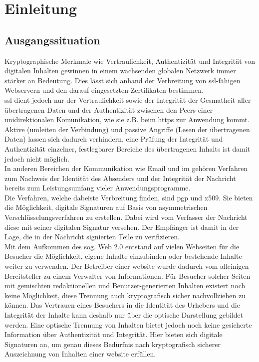 
\chapter{Einleitung}
%
\label{chp:Einleitung}

\section{Ausgangssituation}
%
\label{sec:Einleitung:ausgangssituation}
Kryptographische Merkmale wie Vertraulichkeit, Authentizität und Integrität von digitalen Inhalten gewinnen in einem wachsenden globalen Netzwerk immer
stärker an Bedeutung. Dies lässt sich anhand der Verbreitung von \gls{ssl}-fähigen Webservern und den darauf eingesetzten Zertifikaten bestimmen\cite{ssliverse:eff}.\\

\gls{ssl} dient jedoch nur der Vertraulichkeit sowie der Integrität der Gesmatheit aller übertragenen Daten und der Authentizität zwischen den Peers einer unidirektionalen
Komunikation, wie sie z.B. beim \gls{https} zur Anwendung kommt\cite{kits}. Aktive (umleiten der Verbindung) und passive Angriffe (Lesen der übertragenen Daten)
lassen sich dadurch verhindern, eine Prüfung der Integrität und Authentizität einzelner, festlegbarer Bereiche des übertragenen Inhalts ist damit jedoch nicht möglich.\\

In anderen Bereichen der Kommunikation wie Email und \gls{im} gehören Verfahren zum Nachweis der Identität des Absenders und der Integrität der Nachricht
bereits zum Leistungsumfang vieler Anwendungsprogramme\cite{2719799020071101}.\\
Die Verfahren, welche dabeiste Verbreitung finden, sind \gls{pgp} und \gls{x509}. Sie bieten die Möglichkeit, digitale Signaturen auf Basis von asymmetrischen
Verschlüsselungsverfahren zu erstellen\cite{kits}. Dabei wird vom Verfasser der Nachricht diese mit seiner digitalen Signatur versehen. Der Empfänger ist damit
in der Lage, die in der Nachricht signierten Teile zu verifizieren.\\

Mit dem Aufkommen des sog. Web 2.0 entstand auf vielen Webseiten für die Besucher die Möglichkeit, eigene Inhalte einzubinden oder bestehende Inhalte weiter zu
verwenden. Der Betreiber einer \gls{website} wurde dadurch vom alleinigen Bereitsteller zu einem Verwalter von Informationen. Für Besucher solcher Seiten mit
gemischten redaktionellen und Benutzer-generierten Inhalten existert noch keine Möglichkeit, diese Trennung auch kryptografisch sicher nachvollziehen zu können.
Das Vertrauen eines Besuchers in die Identität des Urhebers und die Integrität der Inhalte kann deshalb nur über die optische Darstellung gebildet werden. Eine
optische Trennung von Inhalten bietet jedoch noch keine gesicherte Information über Authentizität und Integrität. Hier bieten sich digitale Signaturen  an, um
genau dieses Bedürfnis nach kryptografisch sicherer Auszeichnung von Inhalten einer \gls{website} erfüllen.

